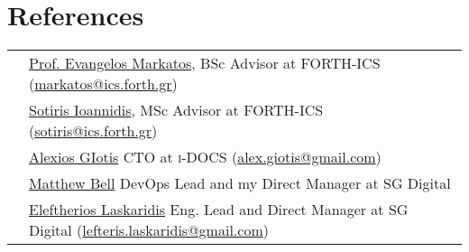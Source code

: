 \documentclass[a4paper,10pt]{article} %
\begin{document}
\section{References}

\begin{tabular}{rl}

& \href{https://www.ics.forth.gr/discs/person/Markatos/Evangelos\%20P.}{Prof. Evangelos Markatos}, BSc Advisor at \textsc{FORTH-ICS} (\href{mailto:markatos@ics.forth.gr}{markatos@ics.forth.gr}) \\
& \href{https://www.ics.forth.gr/discs/person/Ioannidis/\%CE\%A3\%CF\%89\%CF\%84\%CE\%AE\%CF\%81\%CE\%B9\%CE\%BF\%CF\%82}{Sotiris Ioannidis}, MSc Advisor at \textsc{FORTH-ICS} (\href{mailto:sotiris@ics.forth.gr}{sotiris@ics.forth.gr}) \\
& \href{https://www.linkedin.com/in/alexiosgiotis}{Alexios GIotis} CTO at \textsc{i-DOCS} (\href{mailto:alex.giotis@gmail.com}{alex.giotis@gmail.com}) \\
& \href{https://linkedin.com/in/matt-bell-18126341}{Matthew Bell} DevOps Lead and my Direct Manager at SG Digital \\
& \href{https://linkedin.com/in/laskaridis}{Eleftherios Laskaridis} Eng. Lead and Direct Manager at SG Digital (\href{mailto:lefteris.laskaridis@gmail.com}{lefteris.laskaridis@gmail.com})

\end{tabular}
\end{document}
